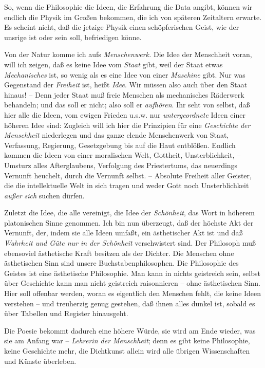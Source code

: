 \documentclass[12pt,letterpaper]{article} %
\begin{document}
So, wenn die Philosophie die Ideen, die Erfahrung die Data angibt, können wir endlich die Physik im Großen bekommen, die ich von späteren Zeitaltern erwarte. Es scheint nicht, daß die jetzige Physik einen schöpferischen Geist, wie der unsrige ist oder sein soll, befriedigen könne.

Von der Natur komme ich aufs \textit{Menschenwerk.} Die Idee der Menschheit voran, will ich zeigen, daß es keine Idee vom \textit{Staat} gibt, weil der Staat etwas \textit{Mechanisches} ist, so wenig als es eine Idee von einer \textit{Maschine} gibt. Nur was Gegenstand der \textit{Freiheit} ist, heißt \textit{Idee}. Wir müssen also auch über den Staat hinaus! – Denn jeder Staat muß freie Menschen als mechanisches Räderwerk behandeln; und das soll er nicht; also soll er \textit{aufhören}. Ihr seht von selbst, daß hier alle die Ideen, vom ewigen Frieden u.s.w. nur \textit{untergeordnete} Ideen einer höheren Idee sind: Zugleich will ich hier die Prinzipien für eine \textit{Geschichte der Menschheit} niederlegen und das ganze elende Menschenwerk von Staat, Verfassung, Regierung, Gesetzgebung bis auf die Haut entblößen. Endlich kommen die Ideen von einer moralischen Welt, Gottheit, Unsterblichkeit, – Umsturz alles Afterglaubens, Verfolgung des Priestertums, das neuerdings Vernunft heuchelt, durch die Vernunft selbst. – Absolute Freiheit aller Geister, die die intellektuelle Welt in sich tragen und weder Gott noch Unsterblichkeit \textit{außer sich} suchen dürfen.

Zuletzt die Idee, die alle vereinigt, die Idee der \textit{Schönheit}, das Wort in höherem platonischen Sinne genommen. Ich bin nun überzeugt, daß der höchste Akt der Vernunft, der, indem sie alle Ideen umfaßt, ein ästhetischer Akt ist und daß \textit{Wahrheit und Güte nur in der Schönheit} verschwistert sind. Der Philosoph muß ebensoviel ästhetische Kraft besitzen als der Dichter. Die Menschen ohne ästhetischen Sinn sind unsere Buchstabenphilosophen. Die Philosophie des Geistes ist eine ästhetische Philosophie. Man kann in nichts geistreich sein, selbst über Geschichte kann man nicht geistreich raisonnieren – ohne ästhetischen Sinn. Hier soll offenbar werden, woran es eigentlich den Menschen fehlt, die keine Ideen verstehen – und treuherzig genug gestehen, daß ihnen alles dunkel ist, sobald es über Tabellen und Register hinausgeht.

Die Poesie bekommt dadurch eine höhere Würde, sie wird am Ende wieder, was sie am Anfang war – \textit{Lehrerin der Menschheit}; denn es gibt keine Philosophie, keine Geschichte mehr, die Dichtkunst allein wird alle übrigen Wissenschaften und Künste überleben.
\end{document}
